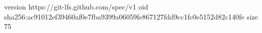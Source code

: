 version https://git-lfs.github.com/spec/v1
oid sha256:ac91012ef39460af0e7fba9399a06059fe867127fdd9cc1fc0e5152d82c140fe
size 75
